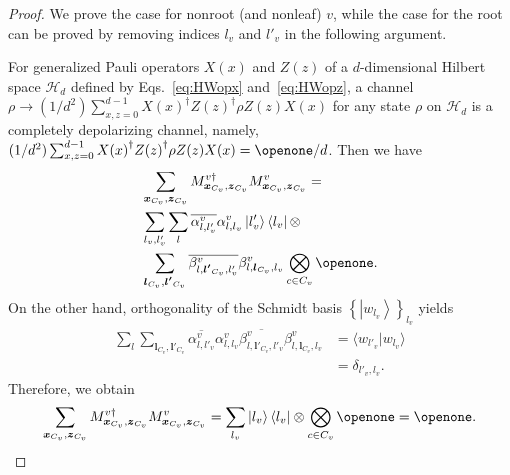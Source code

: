 \documentclass[preprintnumbers,aps,amsmath,amssymb,pra,twocolumn,showpacs,superscriptaddress,floatfix]{revtex4-1}
\def\Bra#1{\left\langle#1\right|}
\def\Ket#1{\left|#1\right\rangle}
\theoremstyle{plain}
\theoremstyle{definition}
\theoremstyle{remark}
\begin{document}
    \begin{proof}
        We prove the case for nonroot  (and nonleaf) $v$, while the case for the root can be proved by removing indices $l_v$ and $l'_v$ in the following argument.

        For generalized Pauli operators $X(x)$ and $Z(z)$ of a $d$-dimensional Hilbert space $\mathcal{H}_d$ defined by Eqs.~\eqref{eq:HWopx} and~\eqref{eq:HWopz},  a channel $\rho \rightarrow (1/d^2)\sum_{x, z=0}^{d-1}{X(x)}^\dag {Z(z)}^\dag\rho Z(z)X(x)$ for any state $\rho$ on $\mathcal{H}_d$ is a completely depolarizing channel, namely, $(1/d^2)\sum_{x, z=0}^{d-1} {X(x)}^\dag {Z(z)}^\dag\rho Z(z)X(x)= \openone /d$.
Then we have
        \begin{equation*}
            \begin{split}
                &\sum_{\boldsymbol{x}_{C_v},\boldsymbol{z}_{C_v}}M^{v\dag}_{\boldsymbol{x}_{C_v},\boldsymbol{z}_{C_v}} M^{v}_{\boldsymbol{x}_{C_v},\boldsymbol{z}_{C_v}}=\\
                &\sum_{l_v,l'_v}\sum_{l}\overline{\alpha^{v}_{l,l'_v}}\alpha^{v}_{l,l_v}\Ket{l'_v}\Bra{l_v}\otimes\\
                &\sum_{\boldsymbol{l}_{C_v},\boldsymbol{l'}_{C_v}}\overline{\beta_{l,\boldsymbol{l'}_{C_v},l'_v}^{v}}\beta_{l,\boldsymbol{l}_{C_v},l_v}^{v}
    \bigotimes_{c\in C_v}\openone.
\end{split}
\end{equation*}
On the other hand, orthogonality of the Schmidt basis $\left\{\Ket{w_{l_v}}\right\} _{l_v}$ yields
\begin{equation*}
            \begin{split}
                \sum_{l}\sum_{\boldsymbol{l}_{C_v},\boldsymbol{l'}_{C_v}}\overline{\alpha^{v}_{l,l'_v}}\alpha^{v}_{l,l_v}
                \overline{\beta_{l,\boldsymbol{l'}_{C_v},l'_v}^{v}}\beta_{l,\boldsymbol{l}_{C_v},l_v}^{v} &= \langle w_{l'_v} | w_{l_v}\rangle\\
                &= \delta_{l'_v,l_v}.
\end{split}
    \end{equation*}
    Therefore, we obtain
        \begin{equation*}
            \sum_{\boldsymbol{x}_{C_v},\boldsymbol{z}_{C_v}}M^{v\dag}_{\boldsymbol{x}_{C_v},\boldsymbol{z}_{C_v}} M^{v}_{\boldsymbol{x}_{C_v},\boldsymbol{z}_{C_v}}=\sum_{l_v}\Ket{l_v}\Bra{l_v}\otimes\bigotimes_{c\in C_{v}}\openone=\openone.
\end{equation*}
    \end{proof}
\end{document}
